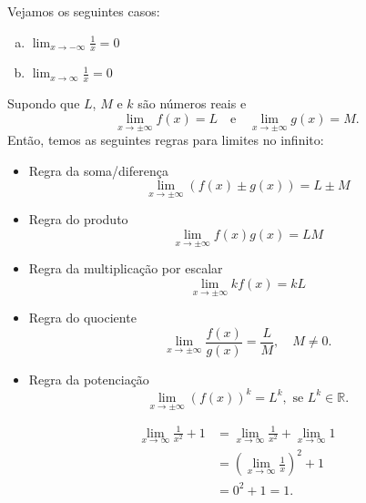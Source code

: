 \begin{ex}
  Vejamos os seguintes casos:
  \begin{enumerate}[a)]
  \item $\displaystyle \lim_{x\to -\infty} \frac{1}{x} = 0$
  \item $\displaystyle \lim_{x\to \infty} \frac{1}{x} = 0$
  \end{enumerate}
\end{ex}

Supondo que $L$, $M$ e $k$ são números reais e
\begin{equation}
  \lim_{x\to \pm\infty} f(x) = L\quad\text{e}\quad\lim_{x\to\pm\infty}g(x) = M.
\end{equation}
Então, temos as seguintes regras para limites no infinito:
\begin{itemize}
\item Regra da soma/diferença
  \begin{equation}
    \lim_{x\to\pm\infty} (f(x)\pm g(x)) = L\pm M
  \end{equation}
\item Regra do produto
  \begin{equation}
    \lim_{x\to\pm\infty} f(x)g(x) = LM
  \end{equation}
\item Regra da multiplicação por escalar
  \begin{equation}
    \lim_{x\to\pm\infty} kf(x) = kL
  \end{equation}
\item Regra do quociente
  \begin{equation}
    \lim_{x\to\pm\infty} \frac{f(x)}{g(x)} = \frac{L}{M},\quad M\neq 0.
  \end{equation}
\item Regra da potenciação
  \begin{equation}
    \lim_{x\to\pm\infty} (f(x))^k = L^k,\text{ se } L^k\in\mathbb{R}.
  \end{equation}
\end{itemize}

\begin{ex}
  \begin{align}
    \lim_{x\to \infty} \frac{1}{x^2}+1 &= \lim_{x\to \infty} \frac{1}{x^2} + \lim_{x\to \infty}1 \\
                                       &= \left(\lim_{x\to\infty} \frac{1}{x}\right)^2 + 1\\
                                       &= 0^2 + 1 = 1.
\end{align}
\end{ex}

